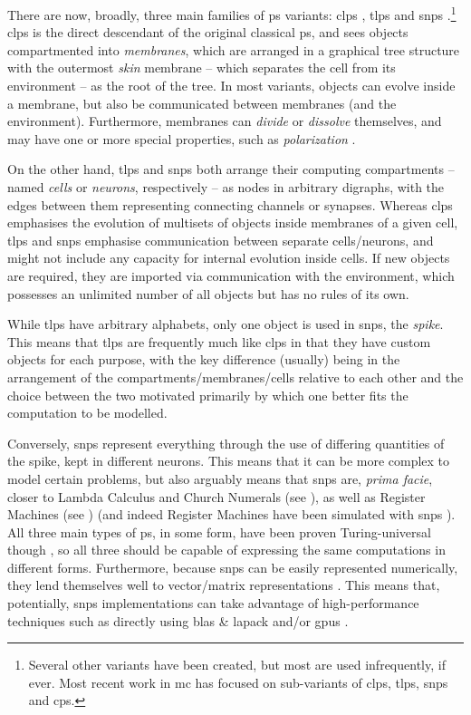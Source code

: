 There are now, broadly, three main families of \gls{ps} variants:  \gls{clps} \cite{Paun2001,Paun2002}, \gls{tlps} \cite{tMaPaPaRo01a,Martin-Vide2003} and \gls{snps} \cite{Ionescu2006}.\footnote{Several other variants have been created, but most are used infrequently, if ever.  Most recent work in \gls{mc} has focused on sub-variants of \gls{clps}, \gls{tlps}, \gls{snps} and \gls{cps}.}  \Gls{clps} is the direct descendant of the original classical \gls{ps}, and sees objects compartmented into \emph{membranes}, which are arranged in a graphical tree structure with the outermost \emph{skin} membrane -- which separates the cell from its environment -- as the root of the tree.  In most variants, objects can evolve inside a membrane, but also be communicated between membranes (and the environment).  Furthermore, membranes can \emph{divide} or \emph{dissolve} themselves, and may have one or more special properties, such as \emph{polarization} \cite{Paun1999a}.

On the other hand, \gls{tlps} and \gls{snps} both arrange their computing compartments -- named \emph{cells} or \emph{neurons}, respectively -- as nodes in arbitrary digraphs, with the edges between them representing connecting channels or synapses.  Whereas \gls{clps} emphasises the evolution of multisets of objects inside membranes of a given cell, \gls{tlps} and \gls{snps} emphasise communication between separate cells/neurons, and might not include any capacity for internal evolution inside cells.  If new objects are required, they are imported via communication with the environment, which possesses an unlimited number of all objects but has no rules of its own.

While \gls{tlps} have arbitrary alphabets, only one object is used in \gls{snps}, the \emph{spike}.  This means that \gls{tlps} are frequently much like \gls{clps} in that they have custom objects for each purpose, with the key difference (usually) being in the arrangement of the compartments/membranes/cells relative to each other and the choice between the two motivated primarily by which one better fits the computation to be modelled.

Conversely, \gls{snps} represent everything through the use of differing quantities of the spike, kept in different neurons.  This means that it can be more complex to model certain problems, but also arguably means that \gls{snps} are, \textit{prima facie}, closer to Lambda Calculus \cite{Barendregt1984} and Church Numerals (see \eg{} \cite{Koopman2014,Hinze2005}), as well as Register Machines (see \eg{} \cite{Korec1996}) (and indeed Register Machines have been simulated with \gls{snps} \cite{Pan2010}).  All three main types of \gls{ps}, in some form, have been proven Turing-universal though \cite{Bernardini2005,Chen2008,Freund2005}, so all three should be capable of expressing the same computations in different forms.  Furthermore, because \gls{snps} can be easily represented numerically, they lend themselves well to vector/matrix representations \cite{Zeng2010,Martinez-del-Amor2021,Gheorghe2021,Hu2016}.  This means that, potentially, \gls{snps} implementations can take advantage of high-performance techniques such as directly using \gls{blas} \& \gls{lapack} and/or \glspl{gpu} \cite{Aboy2019}.

